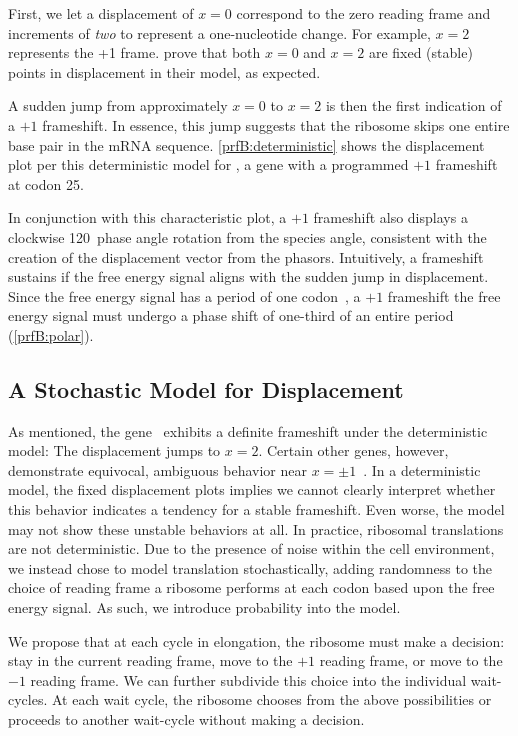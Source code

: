 \documentclass[12pt]{article}
\numberwithin{equation}{section}
\begin{document}
First, we let a displacement of $x = 0$ correspond to the zero reading frame and increments of
\emph{two} to represent a one-nucleotide change. For example, $x =2$ represents the +1 frame.
\citet{lalit:embs} prove that both $x = 0$ and $x = 2$ are fixed (stable) points in displacement in their model,
as expected.

A sudden jump from approximately $x = 0$ to $x = 2$ is then the first indication of a $+1$ frameshift.
In essence, this jump suggests that the ribosome skips one entire base pair in the mRNA sequence.
\autoref{prfB:deterministic} shows the displacement plot per this deterministic model for \prfB, 
a gene with a programmed $+1$ frameshift at codon 25.

In conjunction with this characteristic plot, a $+1$ frameshift also displays a clockwise 120\degree\
phase angle rotation from the species angle, consistent with the
creation of the displacement vector from the phasors.
Intuitively, a frameshift sustains if the free energy signal aligns with the sudden jump in displacement.
Since the free energy signal has a period of one codon~\cite{lalit:mechanics}, a $+1$ frameshift the free energy signal
must undergo a phase shift of one-third of an entire period (\autoref{prfB:polar}).

\subsection{A Stochastic Model for Displacement}
\label{stochastic}

As mentioned, the gene \prfB\ exhibits a definite frameshift under the
deterministic model: The displacement jumps to $x=2$.  Certain other
genes, however, demonstrate equivocal, ambiguous behavior near $x = \pm
1$~\cite{lalit:embs}.  In a deterministic model, the fixed
displacement plots implies we cannot clearly interpret whether this
behavior indicates a tendency for a stable frameshift. Even worse,
the model may not show these unstable behaviors at all. In practice,
ribosomal translations are not deterministic. Due to the presence of
noise within the cell environment, we instead chose to model
translation stochastically, adding randomness to the choice of reading
frame a ribosome performs at each codon based upon the free energy signal.
As such, we introduce probability into the model.

We propose that at each cycle in elongation, the ribosome must make a
decision: stay in the current reading frame, move to the $+1$ reading
frame, or move to the $-1$ reading frame.  We can further subdivide
this choice into the individual wait-cycles.  At each wait cycle, the
ribosome chooses from the above possibilities or proceeds to another
wait-cycle without making a decision.
\end{document}

